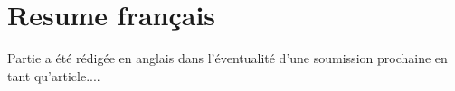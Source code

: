 \hypersetup{pdfborder=0 0 0}




\section{Resume français}

Partie a été rédigée en anglais dans l'éventualité d'une soumission prochaine en tant qu'article....




